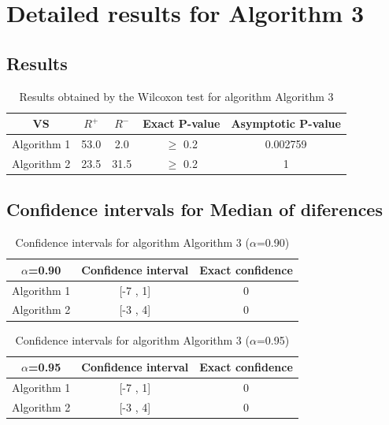\documentclass[a4paper,10pt]{article}
\begin{document}
 \clearpage 


\section{Detailed results for Algorithm 3}


\subsection{Results}

\begin{table}[!htp]
\centering\small
\begin{tabular}{
|c|c|c|c|c|}
\hline
 VS & $R^{+}$ & $R^{-}$ & Exact P-value & Asymptotic P-value \\ \hline 
Algorithm 1 & 53.0 & 2.0 & $\geq$ 0.2 & 0.002759\\ \hline 
Algorithm 2 & 23.5 & 31.5 & $\geq$ 0.2 & 1\\ \hline 

\end{tabular}
\caption{Results obtained by the Wilcoxon test for algorithm Algorithm 3}
\end{table}

\subsection{Confidence intervals for Median of diferences}

\begin{table}[!htp]
\centering\small
\begin{tabular}{
|c|c|c|}
\hline
 $\alpha$=0.90 & Confidence interval & Exact confidence \\ \hline 
Algorithm 1 & [-7 , 1] & 0\\ \hline 
Algorithm 2 & [-3 , 4] & 0\\ \hline 

\end{tabular}
\caption{Confidence intervals for algorithm Algorithm 3 ($\alpha$=0.90)}
\end{table}
\begin{table}[!htp]
\centering\small
\begin{tabular}{
|c|c|c|}
\hline
 $\alpha$=0.95 & Confidence interval & Exact confidence \\ \hline 
Algorithm 1 & [-7 , 1] & 0\\ \hline 
Algorithm 2 & [-3 , 4] & 0\\ \hline 

\end{tabular}
\caption{Confidence intervals for algorithm Algorithm 3 ($\alpha$=0.95)}
\end{table}

 \clearpage 
\end{document}
